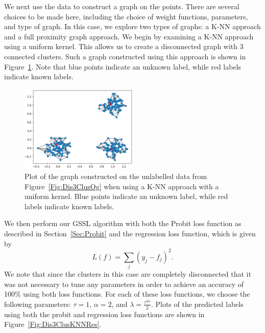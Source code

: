 \documentclass[12pt]{amsart}
\begin{document}
We next use the data to construct a graph on the points. There are several choices to be made here, including the choice of weight functions, parameters, and type of graph. In this case, we explore two types of graphs: a K-NN approach and a full proximity graph approach. We begin by examining a K-NN approach using a uniform kernel. This allows us to create a disconnected graph with 3 connected clusters. Such a graph constructed using this approach is shown in Figure~\ref{Fig:Dis3ClusKNN}. Note that blue points indicate an unknown label, while red labels indicate known labels.
\begin{figure}
    \centering
    \includegraphics[width=0.5\textwidth]{Figures/Dis3ClusKNN.png}
    \caption{
        Plot of the graph constructed on the unlabelled data from Figure~\ref{Fig:Dis3ClusOg} when using a K-NN approach with a uniform kernel. Blue points indicate an unknown label, while red labels indicate known labels. 
    }
	\label{Fig:Dis3ClusKNN}
\end{figure}
We then perform our GSSL algorithm with both the Probit loss function as described in Section~\ref{Sec:Probit} and the regression loss function, which is given by 
\[L(f)=\sum_{j}(y_j-f_j)^2.\]
We note that since the clusters in this case are completely disconnected that it was not necessary to tune any parameters in order to achieve an accuracy of 100\% using both loss functions. For each of these loss functions, we choose the following parameters: $\tau=1$, $\alpha=2$, and $\lambda=\frac{\tau^{2\alpha}}{2}$. Plots of the predicted labels using both the probit and regression loss functions are shown in Figure~\ref{Fig:Dis3ClusKNNRes}.
\end{document}
